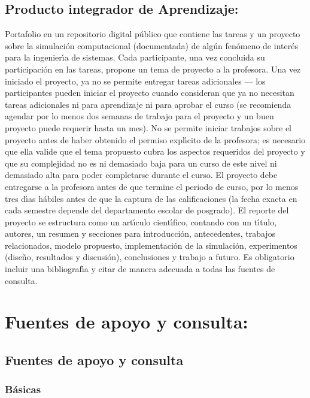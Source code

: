 \documentclass[10 pt]{article}
\begin{document}
\subsection{Producto integrador de Aprendizaje:} Portafolio en un
repositorio digital p\'{u}blico que contiene las tareas y un proyecto
sobre la simulaci\'{o}n computacional (documentada) de alg\'{u}n fen\'{o}meno de
inter\'{e}s para la ingenier\'{\i}a de sistemas. Cada participante, una vez
concluida su participaci\'{o}n en las tareas, propone un tema de proyecto
a la profesora. Una vez iniciado el proyecto, ya no se permite
entregar tareas adicionales --- los participantes pueden iniciar el
proyecto cuando consideran que ya no necesitan tareas adicionales ni
para aprendizaje ni para aprobar el curso (se recomienda agendar por
lo menos dos semanas de trabajo para el proyecto y un buen proyecto
puede requerir hasta un mes). No se permite iniciar trabajos sobre el
proyecto antes de haber obtenido el permiso expl\'{\i}cito de la profesora;
es necesario que ella valide que el tema propuesto cubra los aspectos
requeridos del proyecto y que su complejidad no es ni demasiado baja
para un curso de este nivel ni demasiado alta para poder completarse
durante el curso.  El proyecto debe entregarse a la profesora antes de
que termine el periodo de curso, por lo menos tres d\'{\i}as h\'{a}biles antes
de que la captura de las calificaciones (la fecha exacta en cada
semestre depende del departamento escolar de posgrado). El reporte del
proyecto se estructura como un art\'{\i}culo cient\'{\i}fico, contando
con un t\'{\i}tulo, autores, un resumen y secciones para
introducci\'{o}n, antecedentes, trabajos relacionados, modelo
propuesto, implementaci\'{o}n de la simulaci\'{o}n, experimentos
(dise\~{n}o, resultados y discusi\'{o}n), conclusiones y trabajo a
futuro. Es obligatorio incluir una bibliograf\'{\i}a y citar de manera
adecuada a todas las fuentes de consulta.



\section{Fuentes de apoyo y consulta:}
\subsection{Fuentes de apoyo y consulta}
\subsubsection{B\'{a}sicas}
\end{document}
